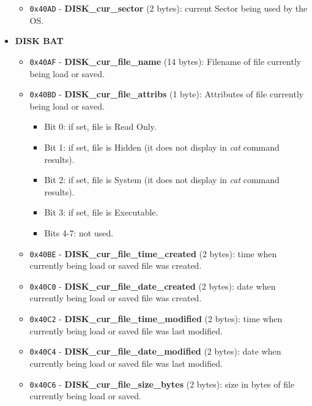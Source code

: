 \begin{itemize}
\begin{itemize}
\begin{itemize}
                \end{itemize}
                \item \texttt{0x40AD} - \textbf{DISK\_cur\_sector} (2 bytes): current
                Sector being used by the OS.
            \end{itemize}
            \item \textbf{DISK BAT}
            \begin{itemize}
                \item \texttt{0x40AF} - \textbf{DISK\_cur\_file\_name} (14 bytes): 
                Filename of file currently being load or saved.
                \item \texttt{0x40BD} - \textbf{DISK\_cur\_file\_attribs} (1 byte):
                Attributes of file currently being load or saved.
                \begin{itemize}
                    \item Bit 0: if set, file is Read Only.
                    \item Bit 1: if set, file is Hidden (it does not display in
                    \textit{cat} command results).
                    \item Bit 2: if set, file is System (it does not display in
                    \textit{cat} command results).
                    \item Bit 3: if set, file is Executable.
                    \item Bits 4-7: not used.
                \end{itemize}
                \item \texttt{0x40BE} - \textbf{DISK\_cur\_file\_time\_created} (2
                bytes): time when currently being load or saved file was created.
                \item \texttt{0x40C0} - \textbf{DISK\_cur\_file\_date\_created} (2
                bytes): date when currently being load or saved file was created.
                \item \texttt{0x40C2} - \textbf{DISK\_cur\_file\_time\_modified} (2
                bytes): time when currently being load or saved file was last modified.
                \item \texttt{0x40C4} - \textbf{DISK\_cur\_file\_date\_modified} (2
                bytes): date when currently being load or saved file was last modified.
                \item \texttt{0x40C6} - \textbf{DISK\_cur\_file\_size\_bytes} (2
                bytes): size in bytes of file currently being load or saved.

\end{itemize}
\end{itemize}
